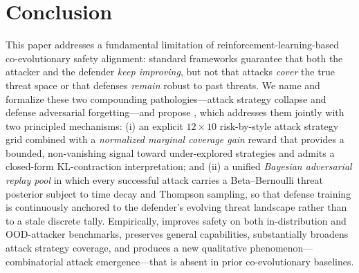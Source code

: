 \section{Conclusion}
\label{sec:conclusion}

This paper addresses a fundamental limitation of reinforcement-learning-based co-evolutionary safety alignment: standard frameworks guarantee that both the attacker and the defender \emph{keep improving}, but not that attacks \emph{cover} the true threat space or that defenses \emph{remain} robust to past threats. We name and formalize these two compounding pathologies---attack strategy collapse and defense adversarial forgetting---and propose \method, which addresses them jointly with two principled mechanisms: (i) an explicit $12\times10$ risk-by-style attack strategy grid combined with a \emph{normalized marginal coverage gain} reward that provides a bounded, non-vanishing signal toward under-explored strategies and admits a closed-form KL-contraction interpretation; and (ii) a unified \emph{Bayesian adversarial replay pool} in which every successful attack carries a Beta--Bernoulli threat posterior subject to time decay and Thompson sampling, so that defense training is continuously anchored to the defender's evolving threat landscape rather than to a stale discrete tally. Empirically, \method improves safety on both in-distribution and OOD-attacker benchmarks, preserves general capabilities, substantially broadens attack strategy coverage, and produces a new qualitative phenomenon---combinatorial attack emergence---that is absent in prior co-evolutionary baselines.

